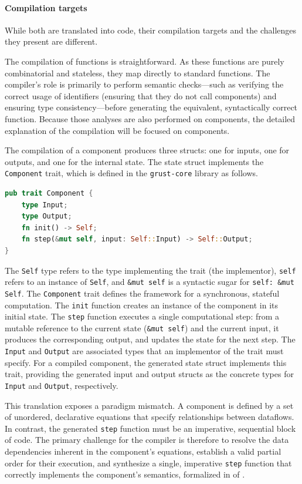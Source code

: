 \paragraph{Compilation targets}
While both are translated into \Rust code, their compilation targets and the challenges they present
are different.

The compilation of \GRSync functions is straightforward. As these functions are purely combinatorial
and stateless, they map directly to standard \Rust functions. The compiler's role is primarily to
perform semantic checks---such as verifying the correct usage of identifiers (ensuring that they do
not call components) and ensuring type consistency---before generating the equivalent, syntactically
correct \Rust function. Because those analyses are also performed on components, the detailed
explanation of the compilation will be focused on components.

The compilation of a \GRSync component produces three \Rust structs: one for inputs, one for
outputs, and one for the internal state. The state struct implements the \texttt{Component} trait,
which is defined in the \texttt{grust-core} library as follows.
\begin{lstlisting}[language=Rust]
pub trait Component {
    type Input;
    type Output;
    fn init() -> Self;
    fn step(&mut self, input: Self::Input) -> Self::Output;
}
\end{lstlisting}
The \texttt{Self} type refers to the type implementing the trait (the implementor), \texttt{self}
refers to an instance of \texttt{Self}, and \texttt{\&mut self} is a syntactic sugar for
\texttt{self: \&mut Self}.
%
The \texttt{Component} trait defines the framework for a synchronous, stateful computation.
The \texttt{init} function creates an instance of the component in its initial state. The
\texttt{step} function executes a single computational step: from a mutable reference to the current
state (\texttt{\&mut self}) and the current input, it produces the corresponding output, and updates
the state for the next step.
%
The \texttt{Input} and \texttt{Output} are associated types that an implementor of the trait must
specify. For a compiled \GRSync component, the generated state struct implements this trait,
providing the generated input and output structs as the concrete types for \texttt{Input} and
\texttt{Output}, respectively.

This translation exposes a paradigm mismatch. A \GRSync component is defined by a set of
unordered, declarative equations that specify relationships between dataflows. In contrast,
the generated \texttt{step} function must be an imperative, sequential block of code.
The primary challenge for the compiler is therefore to resolve the data dependencies
inherent in the component's equations, establish a valid partial order for their
execution, and synthesize a single, imperative \texttt{step} function that correctly
implements the component's semantics, formalized in  of
.

